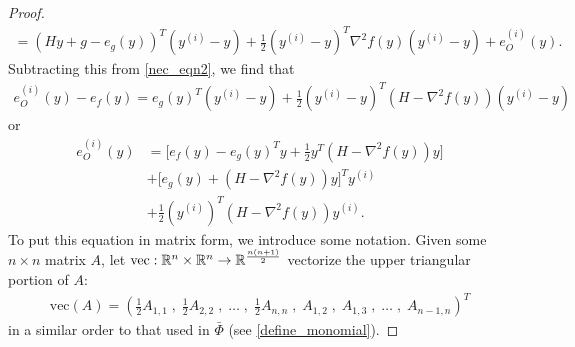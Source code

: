 \documentclass{article}
\newcommand{\matvec}{\mathrm{vec}}
\begin{document}
\begin{proof}
\begin{align*}
= \left(Hy + g - e_g(y)\right)^T  \left(y^{(i)} - y\right) + \frac 1 2 \left(y^{(i)} - y\right)^T \nabla^2 f(y) \left(y^{(i)} - y\right) + e^{(i)}_O\left(y\right).
\end{align*}
Subtracting this from \cref{nec_eqn2}, we find that
\begin{align*}
e^{(i)}_O\left(y\right) - e_f(y) = e_g(y)^T\left(y^{(i)} - y\right) +
\frac 1 2 \left(y^{(i)} - y\right)^T \left(H - \nabla^2 f(y)\right)\left(y^{(i)} - y\right)
\end{align*}
or
\begin{align}
e^{(i)}_O\left(y\right) &= \bigg[e_f(y) - e_g(y)^Ty + \frac 1 2 y^T \left(H - \nabla^2f(y)\right)y \bigg] \nonumber \\
&+ \bigg[e_g(y) + \left(H - \nabla^2 f(y)\right)y\bigg]^T y^{(i)} \nonumber \\
&+ \frac 1 2 \left(y^{(i)}\right)^T \left(H - \nabla^2 f(y)\right)y^{(i)}.
\label{nec_eqn1}
\end{align}
To put this equation in matrix form, we introduce some notation.
Given some $n \times n$ matrix $A$, let $\matvec : \reals^n \times \reals^n \to \reals^{\frac {n(n+1)} 2}$
vectorize the upper triangular portion of $A$:
\begin{align*}
\matvec\left(A\right) =
\left(\frac 1 2 A_{1, 1} \;,\; \frac 1 2 A_{2, 2} \;,\; \ldots \;,\; \frac 1 2 A_{n, n} \;,\; A_{1, 2} \;,\; A_{1, 3} \;,\; \ldots \;,\; A_{n-1, n} \right)^T
\end{align*}
in a similar order to that used in $\bar \Phi$ (see \cref{define_monomial}).

\end{proof}
\end{document}
